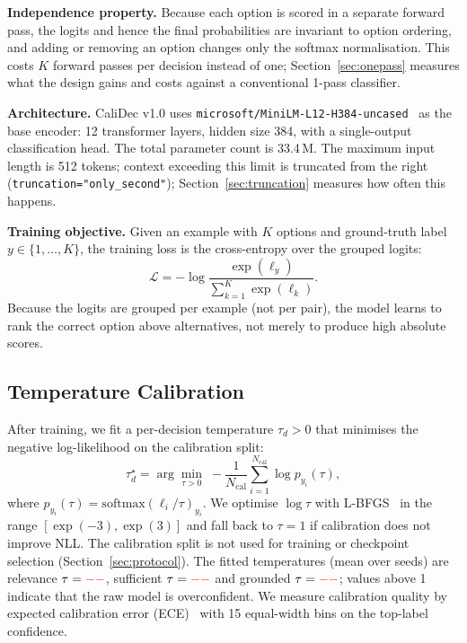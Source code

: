 \documentclass[twocolumn]{ICCKjournal}
\newcommand{\logit}{\ell}
\begin{document}
\textbf{Independence property.} Because each option is scored in a separate forward pass, the logits and hence the final probabilities are invariant to option ordering, and adding or removing an option changes only the softmax normalisation. This costs $K$ forward passes per decision instead of one; Section~\ref{sec:onepass} measures what the design gains and costs against a conventional 1-pass classifier.

\textbf{Architecture.} CaliDec v1.0 uses \texttt{microsoft/MiniLM-L12-H384-uncased}~\cite{wang2020minilm} as the base encoder: 12 transformer layers, hidden size 384, with a single-output classification head. The total parameter count is 33.4\,M. The maximum input length is 512 tokens; context exceeding this limit is truncated from the right (\texttt{truncation="only\_second"}); Section~\ref{sec:truncation} measures how often this happens.

\textbf{Training objective.} Given an example with $K$ options and ground-truth label $y \in \{1, \dots, K\}$, the training loss is the cross-entropy over the grouped logits:
\begin{equation}
    \mathcal{L} = -\log \frac{\exp(\logit_y)}{\sum_{k=1}^{K} \exp(\logit_k)}.
    \label{eq:loss}
\end{equation}
Because the logits are grouped per example (not per pair), the model learns to rank the correct option above alternatives, not merely to produce high absolute scores.

\subsection{Temperature Calibration}
\label{sec:calibration}
After training, we fit a per-decision temperature $\tau_d > 0$ that minimises the negative log-likelihood on the calibration split:
\begin{equation}
    \tau_d^\star = \arg\min_{\tau > 0}\; -\frac{1}{N_{\mathrm{cal}}} \sum_{i=1}^{N_{\mathrm{cal}}} \log p_{y_i}(\tau),
    \label{eq:tempfit}
\end{equation}
where $p_{y_i}(\tau) = \mathrm{softmax}(\boldsymbol\logit_i / \tau)_{y_i}$. We optimise $\log\tau$ with L-BFGS~\cite{liu1989lbfgs} in the range $[\exp(-3), \exp(3)]$ and fall back to $\tau=1$ if calibration does not improve NLL. The calibration split is not used for training or checkpoint selection (Section~\ref{sec:protocol}). The fitted temperatures (mean over seeds) are relevance $\tau = \textcolor{red}{--}$, sufficient $\tau = \textcolor{red}{--}$ and grounded $\tau = \textcolor{red}{--}$; values above 1 indicate that the raw model is overconfident. We measure calibration quality by expected calibration error (ECE)~\cite{naeini2015ece} with 15 equal-width bins on the top-label confidence.
\end{document}

